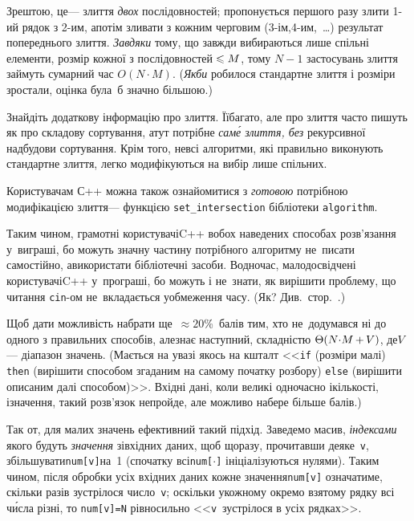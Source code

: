 Зрештою, це\nolinebreak[3] --- злиття \emph{двох} послідовностей; пропонується першого разу злити \mbox{1-ий} рядок з \mbox{2-им}, а\nolinebreak[3] потім зливати з кожним черговим (\mbox{3-ім},\nolinebreak[2] \mbox{4-им},~\dots) результат попереднього злиття. \emph{Завдяки} тому, що завжди вибираються лише спільні елементи, розмір кожної з послідовностей${}\leqslant M$, тому ${N{-}1}$ застосувань злиття займуть сумарний час $O(N{\cdot}M)$. (\emph{Якби} робилося стандартне злиття і розміри зростали, оцінка була~б значно більшою.)

Знайдіть додаткову інформацію про злиття. Її\nolinebreak[2] багато, але про злиття часто пишуть як про складову сортування, а\nolinebreak[3] тут потрібне \emph{сам\'{е} злиття, без} рекурсивної надбудови сортування. Крім того, не\nolinebreak[3] всі алгоритми, які правильно виконують стандартне злиття, легко модифікуються на вибір лише спільних.

Користувачам С++ можна також ознайомитися з \emph{готовою} потрібною модифікацією злиття\nolinebreak[3] --- функцією \verb"set_intersection" бібліотеки \verb"algorithm".

Таким чином, грамотні користувачі\nolinebreak[3] C++ в\nolinebreak[3] обох наведених способах розв'язання у~виграші, бо можуть значну частину потрібного алгоритму не~писати самостійно, а\nolinebreak[3] використати бібліотечні засоби. Водночас, малодосвідчені користувачі\nolinebreak[3] C++ у~програші, бо можуть і не~знати, як вирішити проблему, що читання \verb"cin"-ом не~вкладається у\nolinebreak[3] обмеження часу. (Як? Див.~стор.~\pageref{text:io-streams-versus-scanf-printf}.)

Щоб дати можливість набрати ще~${\approx}20$\%~балів тим, хто не~додумався ні до одного з правильних способів, але\nolinebreak[3] знає наступний, складністю $\Theta(N{\cdot}M\dib{{+}}V)$, де\nolinebreak[3] $V$\nolinebreak[3] --- діапазон значень. (Мається на увазі якось на кшталт <<\texttt{if} (розміри малі) \texttt{then} (вирішити способом згаданим на самому початку розбору) \texttt{else} (вирішити описаним далі способом)>>. Вхідні дані, коли великі одночасно і\nolinebreak[3] кількості, і\nolinebreak[3] значення, такий розв'язок не\nolinebreak[3] пройде, але можливо набере більше балів.)

Так от, для малих значень ефективний такий підхід. Заведемо масив, \emph{індексами} якого будуть \emph{значення} зі\nolinebreak[3] вхідних даних, щоб щоразу, прочитавши деяке~\texttt{v}, збільшувати\nolinebreak[2] \texttt{num[v]}\nolinebreak[2] на~1 (спочатку всі\nolinebreak[3] \texttt{num[$\cdot$]} ініціалізуються нулями). Таким чином, після обробки усіх вхідних даних кожне значення\nolinebreak[2] \texttt{num[v]} означатиме, скільки разів зустрілося число~\texttt{v}; оскільки у\nolinebreak[3] кожному окремо взятому рядку всі ч\'{и}сла різні, то \mbox{\texttt{num[v]=N}} рівносильно <<\texttt{v}~зустрілося в усіх рядках>>.\label{text:omnipresent-numbers-end}
